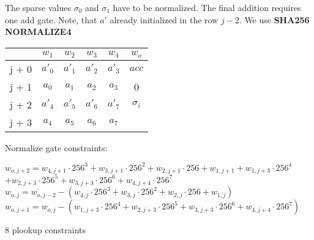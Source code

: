 The sparse values $\sigma_0$ and $\sigma_1$ have to be normalized.
The final addition requires one add gate.
Note, that $a'$ already initialized in the row $j - 2$.
We use \textbf{SHA256 NORMALIZE4}
\begin{center}
\begin{tabular}{ c|c|c|c|c|c } 
  & $w_1$ & $w_2$ & $w_3$ & $w_4$ & $w_o$\\ 
 \hline
j + 0 & $a'_0$ & $a'_1$ & $a'_2$ & $a'_3$ &  $acc$\\ 
j + 1 & $a_0$ & $ a_1$ & $a_2$ & $a_3$ & 0\\
j + 2 & $a'_4$ & $a'_5$ & $a'_6$ & $a'_7$ & $\sigma_i$\\ 
j + 3 & $a_4$ & $ a_5$ & $a_6$ & $a_7$ &  \\
\end{tabular}
\end{center}

Normalize gate constraints:
\begin{center}
$w_{o,j+2} = w_{4,j+1} \cdot 256^3 + w_{3,j+1} \cdot 256^2 + w_{2,j+1} \cdot 256 + w_{1,j+1} 
	+ w_{1,j+3} \cdot 256^4$ \\
	$+ w_{2,j+3} \cdot 256^5+ w_{3,j+3} \cdot 256^6 + w_{4,j+4} \cdot 256^7$ \\
$w_{o,j} = w_{o, j - 2} - (w_{4,j} \cdot 256^3 + w_{3,j} \cdot 256^2 + w_{2,j} \cdot 256 + w_{1,j})$ \\
$w_{o,j+1} = w_{o,j} - ( w_{1,j+3} \cdot 256^4 + w_{2,j+3} \cdot 256^5+ w_{3,j+3} \cdot 256^6 + w_{4,j+4} \cdot 256^7)$

8 plookup constraints \\
\end{center}

